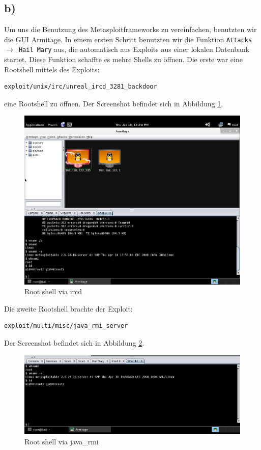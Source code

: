 \documentclass[10pt,a4paper]{article}
\begin{document}
\subsection*{b)}

Um uns die Benutzung des Metasploitframeworks zu vereinfachen, benutzten wir die GUI Armitage. In einem ersten Schritt benutzten wir die Funktion \texttt{Attacks $\rightarrow$ Hail Mary} aus, die automatisch aus Exploits aus einer lokalen Datenbank startet. Diese Funktion schaffte es mehre Shells zu öffnen. 
Die erste war eine Rootshell mittels des Exploits:
\begin{verbatim}
exploit/unix/irc/unreal_ircd_3281_backdoor
\end{verbatim}
eine Rootshell zu öffnen. Der Screenshot befindet sich in Abbildung \ref{ircd_root}.
\begin{figure}
\includegraphics[scale=0.5]{figures/ircd_rootshell.png}
\caption{Root shell via ircd}
\label{ircd_root}
\end{figure}

Die zweite Rootshell brachte der Exploit:
\begin{verbatim}
exploit/multi/misc/java_rmi_server
\end{verbatim}
Der Screenshot befindet sich in Abbildung \ref{java_rmi}.
\begin{figure}
\includegraphics[scale=0.5]{figures/java_rmi.png}
\caption{Root shell via java\_rmi}
\label{java_rmi}
\end{figure}
\end{document}
